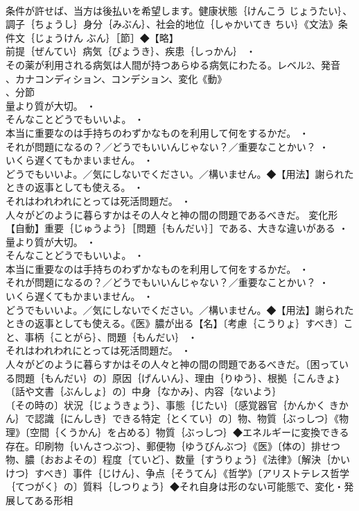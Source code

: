 \documentclass[8pt]{extreport}
\begin{document}
\begin{CJK}{UTF8}{min}
\\	条件が許せば、当方は後払いを希望します。健康状態｛けんこう じょうたい｝、調子｛ちょうし｝身分｛みぶん｝、社会的地位｛しゃかいてき ちい｝《文法》条件文｛じょうけん ぶん｝［節］◆【略】
\\	前提｛ぜんてい｝病気｛びょうき｝、疾患｛しっかん｝ ・
\\	その薬が利用される病気は人間が持つあらゆる病気にわたる。レベル2、発音
\\	、カナコンディション、コンデション、変化《動》
\\	、分節
\\	量より質が大切。 ・
\\	そんなことどうでもいいよ。 ・
\\	本当に重要なのは手持ちのわずかなものを利用して何をするかだ。 ・
\\	それが問題になるの？／どうでもいいんじゃない？／重要なことかい？ ・
\\	いくら遅くてもかまいません。 ・
\\	どうでもいいよ。／気にしないでください。／構いません。◆【用法】謝られたときの返事としても使える。 ・
\\	それはわれわれにとっては死活問題だ。 ・
\\	人々がどのように暮らすかはその人々と神の間の問題であるべきだ。	変化形 
\\	【自動】重要｛じゅうよう｝［問題｛もんだい｝］である、大きな違いがある ・
\\	量より質が大切。 ・
\\	そんなことどうでもいいよ。 ・
\\	本当に重要なのは手持ちのわずかなものを利用して何をするかだ。 ・
\\	それが問題になるの？／どうでもいいんじゃない？／重要なことかい？ ・
\\	いくら遅くてもかまいません。 ・
\\	どうでもいいよ。／気にしないでください。／構いません。◆【用法】謝られたときの返事としても使える。《医》膿が出る【名】〔考慮｛こうりょ｝すべき〕こと、事柄｛ことがら｝、問題｛もんだい｝ ・
\\	それはわれわれにとっては死活問題だ。 ・
\\	人々がどのように暮らすかはその人々と神の間の問題であるべきだ。〔困っている問題｛もんだい｝の〕原因｛げんいん｝、理由｛りゆう｝、根拠｛こんきょ｝〔話や文書｛ぶんしょ｝の〕中身｛なかみ｝、内容｛ないよう｝
\\	〔その時の〕状況｛じょうきょう｝、事態｛じたい｝〔感覚器官｛かんかく きかん｝で認識｛にんしき｝できる特定｛とくてい｝の〕物、物質｛ぶっしつ｝《物理》〔空間｛くうかん｝を占める〕物質｛ぶっしつ｝◆エネルギーに変換できる存在。印刷物｛いんさつぶつ｝、郵便物｛ゆうびんぶつ｝《医》〔体の〕排せつ物、膿〔おおよその〕程度｛ていど｝、数量｛すうりょう｝《法律》〔解決｛かいけつ｝すべき〕事件｛じけん｝、争点｛そうてん｝《哲学》〔アリストテレス哲学｛てつがく｝の〕質料｛しつりょう｝◆それ自身は形のない可能態で、変化・発展してある形相

\end{CJK}
\end{document}
